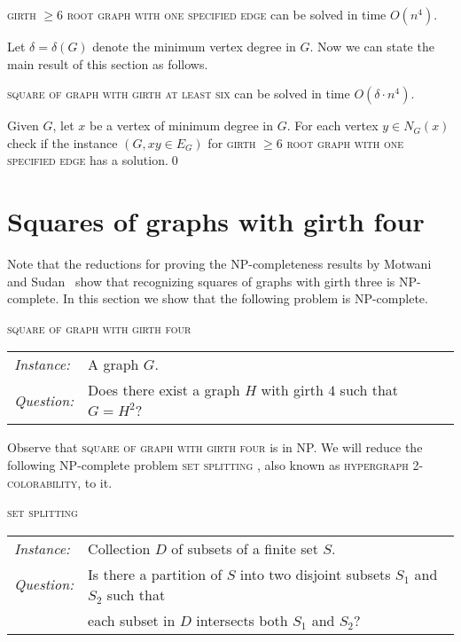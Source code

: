 \documentclass[proceedings]{stacs}
\newlength{\ai}
\begin{document}
\begin{theorem}\label{thm:fix-edge}
\textsc{girth $\ge 6$ root graph with one specified edge} can be solved in time $O(n^4)$.
\end{theorem}


Let $\delta=\delta(G)$ denote the minimum vertex degree in $G$. Now we can state the main result of this
section as follows.
\begin{theorem}\label{thm:girth6}
\textsc{square of graph with girth at least six} can be solved in time $O(\delta\cdot n^4)$.
\end{theorem}
\proof Given $G$, let $x$ be a vertex of minimum degree in $G$. For each vertex $y\in N_G(x)$
check if the instance $(G, xy\in E_G)$ for \textsc{girth $\ge 6$ root graph with one specified edge}
has a solution.\qed




\section{Squares of graphs with girth four}\label{sec:girth3&4}
Note that the reductions for proving the NP-completeness results by Motwani and Sudan~\cite{MotSud1994} show that recognizing squares of graphs with
girth three is NP-complete.
In this section we show that the following problem is NP-complete.

\textsc{square of graph with girth four}\\[1ex]
\begin{tabular}{l l}
{\em Instance:}& A graph $G$.\\
{\em Question:}& Does there exist a graph $H$ with girth $4$ such that $G=H^2$?\\
\end{tabular}

Observe that \textsc{square of graph with girth four} is in NP. We will reduce the following
NP-complete problem \textsc{set splitting} \cite[Problem SP4]{GarJoh}, also known as
\textsc{hypergraph 2-colorability}, to it.

\textsc{set splitting}\\[1ex]
\begin{tabular}{l l}
{\em Instance:}& Collection $D$ of subsets of a finite set $S$.\\
{\em Question:}& Is there a partition of $S$ into two disjoint subsets $S_1$ and $S_2$ such that\\
               & each subset in $D$ intersects both $S_1$ and $S_2$?\\
\end{tabular}
\end{document}
